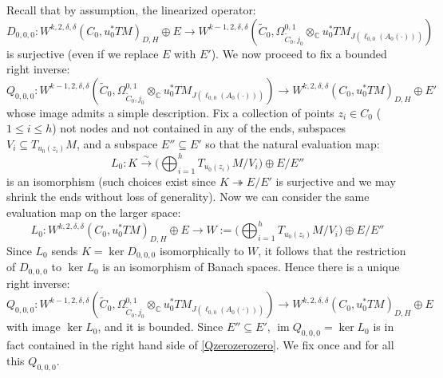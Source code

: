\documentclass[12pt]{article}
\theoremstyle{definition}
\theoremstyle{remark}
\numberwithin{equation}{subsection}
\newcommand{\CC}{\mathbb C}
\newcommand{\im}{\operatorname{im}}
\begin{document}
Recall that by assumption, the linearized operator:
\begin{equation}
D_{0,0,0}:W^{k,2,\delta,\delta}(C_0,u_0^\ast TM)_{D,H}\oplus E\to W^{k-1,2,\delta,\delta}(\tilde C_0,\Omega^{0,1}_{\tilde C_0,j_0}\otimes_\CC u_0^\ast TM_{J(\ell_{0,0}(A_0(\cdot)))})
\end{equation}
is surjective (even if we replace $E$ with $E'$).  We now proceed to fix a bounded right inverse:
\begin{equation}\label{Qzerozerozero}
Q_{0,0,0}:W^{k-1,2,\delta,\delta}(\tilde C_0,\Omega^{0,1}_{\tilde C_0,j_0}\otimes_\CC u_0^\ast TM_{J(\ell_{0,0}(A_0(\cdot)))})\to W^{k,2,\delta,\delta}(C_0,u_0^\ast TM)_{D,H}\oplus E'
\end{equation}
whose image admits a simple description.  Fix a collection of points $z_i\in C_0$ ($1\leq i\leq h$) not nodes and not contained in any of the ends, subspaces $V_i\subseteq T_{u_0(z_i)}M$, and a subspace $E''\subseteq E'$ so that the natural evaluation map:
\begin{equation}
L_0:K\xrightarrow\sim\biggl(\bigoplus_{i=1}^hT_{u_0(z_i)}M/V_i\biggr)\oplus E/E''
\end{equation}
is an isomorphism (such choices exist since $K\twoheadrightarrow E/E'$ is surjective and we may shrink the ends without loss of generality).  Now we can consider the same evaluation map on the larger space:
\begin{equation}\label{lineartofixinverseHF}
L_0:W^{k,2,\delta,\delta}(C_0,u_0^\ast TM)_{D,H}\oplus E\to W:=\biggl(\bigoplus_{i=1}^hT_{u_0(z_i)}M/V_i\biggr)\oplus E/E''
\end{equation}
Since $L_0$ sends $K=\ker D_{0,0,0}$ isomorphically to $W$, it follows that the restriction of $D_{0,0,0}$ to $\ker L_0$ is an isomorphism of Banach spaces.  Hence there is a unique right inverse:
\begin{equation}
Q_{0,0,0}:W^{k-1,2,\delta,\delta}(\tilde C_0,\Omega^{0,1}_{\tilde C_0,j_0}\otimes_\CC u_0^\ast TM_{J(\ell_{0,0}(A_0(\cdot)))})\to W^{k,2,\delta,\delta}(C_0,u_0^\ast TM)_{D,H}\oplus E
\end{equation}
with image $\ker L_0$, and it is bounded.  Since $E''\subseteq E'$, $\im Q_{0,0,0}=\ker L_0$ is in fact contained in the right hand side of \eqref{Qzerozerozero}.  We fix once and for all this $Q_{0,0,0}$.
\end{document}
